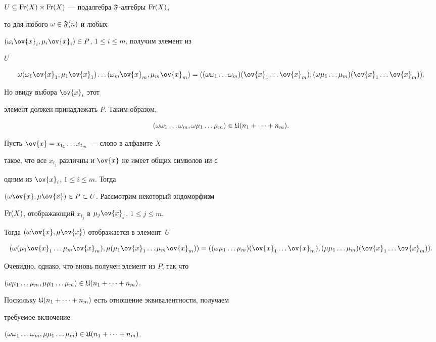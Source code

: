 \begin{pf}
$U\subseteq \operatorname{Fr}(X)\times \operatorname{Fr}(X)$ --- подалгебра $\frak F$-алгебры $\operatorname{Fr}(X)$,


то для любого $\omega\in\frak F(n)$ и любых


$(\o_i\ov{x}_i,\mu_i\ov{x}_i)\in P$, $1\le i\le m$, получим элемент из


$U$


$$


\o(\o_1\ov{x}_1,\mu_1\ov{x}_1)\dotsc (\o_m\ov{x}_m,\mu_m\ov{x}_m)=


((\o\o_1\dotsc\o_m)(\ov{x}_1 \dotsc \ov{x}_m),


(\o\mu_1\dotsc\mu_m)(\ov{x}_1\dotsc\ov{x}_m)).


$$


Но ввиду выбора $\ov{x}_i$ этот


элемент должен принадлежать $P$. Таким образом,


$$


(\o\o_1\dotsc\o_m,\o\mu_1\dotsc\mu_m)\in \U(n_1+\dotsb+n_m).


$$


Пусть $\ov{x}=x_{t_1}\dotsc x_{t_m}$ --- слово в алфавите $X$


такое, что все $x_{t_j}$ различны и $\ov{x}$ не имеет общих символов ни с


одним из $\ov{x}_i$, $1\le i \le m$. Тогда


$(\o\ov{x},\mu\ov{x})\in P\subset U$. Рассмотрим некоторый эндоморфизм


$\operatorname{Fr}(X)$, отображающий $x_{t_j}$ в $\mu_j\ov{x}_j$, $1\le j \le m$.


Тогда $(\o\ov{x},\mu\ov{x}) $ отображается в элемент~$U$


$$


(\o(\mu_1\ov{x}_1\dotsc \mu_m\ov{x}_m),


\mu(\mu_1\ov{x}_1\dotsc\mu_m\ov{x}_m))=


((\o\mu_1\dotsc\mu_m)(\ov{x}_1 \dotsc \ov{x}_m),


(\mu\mu_1\dotsc\mu_m)(\ov{x}_1\dotsc\ov{x}_m)).


$$


Очевидно, однако, что вновь получен элемент из $P$, так что


$(\o\mu_1\dotsc\mu_m,\mu\mu_1\dotsc\mu_m)\in


\U(n_1+\dotsb+n_m)$.


Поскольку $\frak U(n_1+\dotsb+n_m)$ есть отношение эквивалентности, получаем


требуемое включение


$(\omega\omega_1\dotsc\omega_m, \mu\mu_1\dotsc\mu_m)\in\frak U(n_1+\dotsb+n_m)$.



\end{pf}
